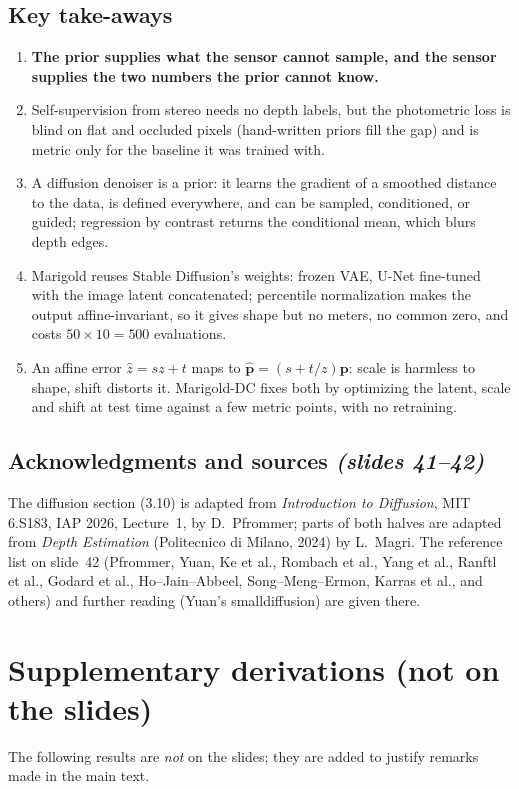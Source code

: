\documentclass[11pt,a4paper]{article}
\newcommand{\slides}[1]{\texorpdfstring{\emph{(slides #1)}}{(slides #1)}}
\theoremstyle{plain}
\theoremstyle{definition}
\numberwithin{equation}{section}
\begin{document}
\subsection*{Key take-aways}
\begin{enumerate}[nosep]
 \item \textbf{The prior supplies what the sensor cannot sample, and the sensor supplies the two numbers the prior cannot know.}
 \item Self-supervision from stereo needs no depth labels, but the photometric loss is blind on flat and occluded pixels (hand-written priors fill the gap) and is metric only for the baseline it was trained with.
 \item A diffusion denoiser is a prior: it learns the gradient of a smoothed distance to the data, is defined everywhere, and can be sampled, conditioned, or guided; regression by contrast returns the conditional mean, which blurs depth edges.
 \item Marigold reuses Stable Diffusion's weights: frozen VAE, U-Net fine-tuned with the image latent concatenated; percentile normalization makes the output affine-invariant, so it gives shape but no meters, no common zero, and costs $50\times10=500$ evaluations.
 \item An affine error $\hat z=sz+t$ maps to $\hat{\bm p}=(s+t/z)\bm p$: scale is harmless to shape, shift distorts it. Marigold-DC fixes both by optimizing the latent, scale and shift at test time against a few metric points, with no retraining.
\end{enumerate}

\subsection*{Acknowledgments and sources \slides{41--42}}
The diffusion section (3.10) is adapted from \emph{Introduction to Diffusion}, MIT 6.S183, IAP 2026, Lecture~1, by D.~Pfrommer; parts of both halves are adapted from \emph{Depth Estimation} (Politecnico di Milano, 2024) by L.~Magri. The reference list on slide~42 (Pfrommer, Yuan, Ke et al., Rombach et al., Yang et al., Ranftl et al., Godard et al., Ho--Jain--Abbeel, Song--Meng--Ermon, Karras et al., and others) and further reading (Yuan's smalldiffusion) are given there.

\appendix
\section{Supplementary derivations (not on the slides)}\label{app:supp}
The following results are \emph{not} on the slides; they are added to justify remarks made in the main text.
\end{document}
